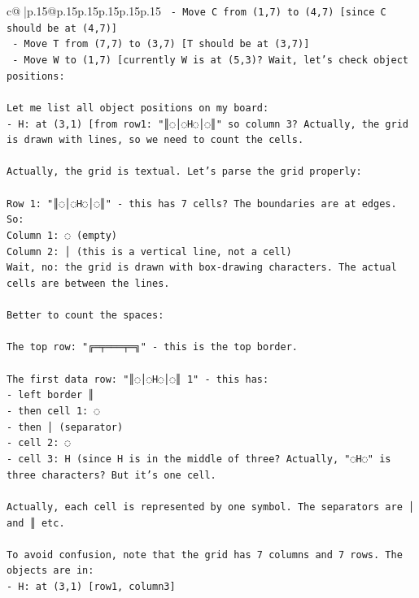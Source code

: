 \documentclass{article}
\begin{document}
{\begin{supertabular}{c@{$\;$}|p{.15\linewidth}@{}p{.15\linewidth}p{.15\linewidth}p{.15\linewidth}p{.15\linewidth}p{.15\linewidth}}
{{{\texttt{   {-} Move C from (1,7) to (4,7) {[}since C should be at (4,7){]}} \\
\texttt{   {-} Move T from (7,7) to (3,7) {[}T should be at (3,7){]}} \\
\texttt{   {-} Move W to (1,7) {[}currently W is at (5,3)? Wait, let's check object positions:} \\
\\ 
\texttt{Let me list all object positions on my board:} \\
\texttt{{-} H: at (3,1) {[}from row1: "║◌│◌H◌│◌║" so column 3? Actually, the grid is drawn with lines, so we need to count the cells.} \\
\\ 
\texttt{Actually, the grid is textual. Let's parse the grid properly:} \\
\\ 
\texttt{Row 1: "║◌│◌H◌│◌║" {-} this has 7 cells? The boundaries are at edges. So:} \\
\texttt{Column 1: ◌ (empty)} \\
\texttt{Column 2: │ (this is a vertical line, not a cell)} \\
\texttt{Wait, no: the grid is drawn with box{-}drawing characters. The actual cells are between the lines.} \\
\\ 
\texttt{Better to count the spaces:} \\
\\ 
\texttt{The top row: "╔═╤═══╤═╗" {-} this is the top border.} \\
\\ 
\texttt{The first data row: "║◌│◌H◌│◌║ 1" {-} this has:} \\
\texttt{{-} left border ║} \\
\texttt{{-} then cell 1: ◌} \\
\texttt{{-} then │ (separator)} \\
\texttt{{-} cell 2: ◌} \\
\texttt{{-} cell 3: H (since H is in the middle of three? Actually, "◌H◌" is three characters? But it's one cell.} \\
\\ 
\texttt{Actually, each cell is represented by one symbol. The separators are │ and ║ etc.} \\
\\ 
\texttt{To avoid confusion, note that the grid has 7 columns and 7 rows. The objects are in:} \\
\texttt{{-} H: at (3,1) {[}row1, column3{]}} \\
}}}
\end{supertabular}}
\end{document}
